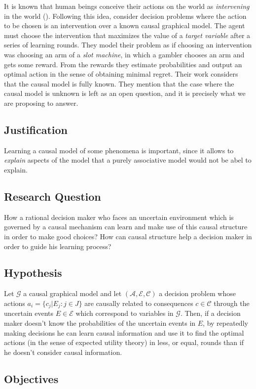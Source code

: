 \documentclass[11pt]{article}
\theoremstyle{plain}
\begin{document}
	It is known that human beings conceive their actions on the world as \textit{intervening} in the world (\cite{hagmayer2009decision}). Following this idea, \cite{lattimoreNIPS2016} consider decision problems where the action to be chosen is an intervention over a known causal graphical model. The agent must choose the intervention that maximizes the value of a \textit{target variable} after a series of learning rounds. They model their problem as if choosing an intervention was choosing an arm of a \textit{slot machine}, in which a gambler chooses an arm and gets some reward. From the rewards they estimate probabilities and output an optimal action in the sense of obtaining minimal regret. Their work considers that the causal model is fully known. They mention that the case where the causal model is unknown is left as an open question, and it is precisely what we are proposing to answer. 
	\subsection{Justification}
	Learning a causal model of some phenomena is important, since it allows to \textit{explain} aspects of the model that a purely associative model would not be abel to explain. 
	
	
	\subsection{Research Question}
	How a rational decision maker who faces an uncertain environment which is governed by a causal mechanism can learn and make use of this causal structure in order to make good choices? How can causal structure help a decision maker in order to guide his learning process?
	\subsection{Hypothesis}
	Let $\mathcal{G}$ a causal graphical model and let $(\mathcal{A},\mathcal{E},\mathcal{C})$ a decision problem whose actions $a_i = \{ c_j | E_j : j \in J \}$  are causally related to consequences $c \in \mathcal{C}$ through the uncertain events $E \in \mathcal{E}$ which correspond to variables in $\mathcal{G}$. Then, if a decision maker doesn't know the probabilities of the uncertain events in $E$, by repeatedly making decisions he can learn causal information and use it to find the optimal actions (in the sense of expected utility theory) in less, or equal, rounds than if he doesn't consider causal information.
	\subsection{Objectives}
\end{document}
